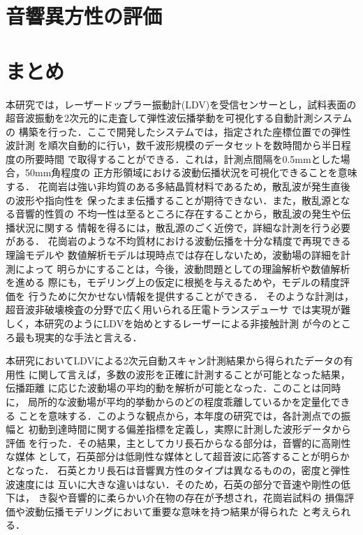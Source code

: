 ﻿\documentclass[11pt,a4j]{jarticle}
\begin{document}
\section{音響異方性の評価}

\newpage
\section{まとめ}
本研究では，レーザードップラー振動計(LDV)を受信センサーとし，試料表面の
超音波振動を2次元的に走査して弾性波伝播挙動を可視化する自動計測システムの
構築を行った．ここで開発したシステムでは，指定された座標位置での弾性波計測
を順次自動的に行い，数千波形規模のデータセットを数時間から半日程度の所要時間
で取得することができる．これは，計測点間隔を0.5mmとした場合，50mm角程度の
正方形領域における波動伝播状況を可視化できることを意味する．
花崗岩は強い非均質のある多結晶質材料であるため，散乱波が発生直後の波形や指向性を
保ったまま伝播することが期待できない．また，散乱源となる音響的性質の
不均一性は至るところに存在することから，散乱波の発生や伝播状況に関する
情報を得るには，散乱源のごく近傍で，詳細な計測を行う必要がある．
花崗岩のような不均質材における波動伝播を十分な精度で再現できる理論モデルや
数値解析モデルは現時点では存在しないため，波動場の詳細を計測によって
明らかにすることは，今後，波動問題としての理論解析や数値解析を進める
際にも，モデリング上の仮定に根拠を与えるためや，モデルの精度評価を
行うために欠かせない情報を提供することができる．
そのような計測は，超音波非破壊検査の分野で広く用いられる圧電トランスデューサ
では実現が難しく，本研究のようにLDVを始めとするレーザーによる非接触計測
が今のところ最も現実的な手法と言える．

本研究においてLDVによる2次元自動スキャン計測結果から得られたデータの有用性
に関して言えば，多数の波形を正確に計測することが可能となった結果，伝播距離
に応じた波動場の平均的動を解析が可能となった．このことは同時に，
局所的な波動場が平均的挙動からのどの程度乖離しているかを定量化できる
ことを意味する．このような観点から，本年度の研究では，各計測点での振幅と
初動到達時間に関する偏差指標を定義し，実際に計測した波形データから評価
を行った．その結果，主としてカリ長石からなる部分は，音響的に高剛性な媒体
として，石英部分は低剛性な媒体として超音波に応答することが明らかとなった．
石英とカリ長石は音響異方性のタイプは異なるものの，密度と弾性波速度には
互いに大きな違いはない．そのため，石英の部分で音速や剛性の低下は，
き裂や音響的に柔らかい介在物の存在が予想され，花崗岩試料の
損傷評価や波動伝播モデリングにおいて重要な意味を持つ結果が得られた
と考えられる．
\end{document}
